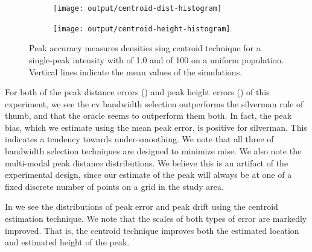 \begin{figure}[htbp]
    \centering
    \begin{subfigure}[b]{0.45\textwidth}
        \texttt{[image: output/centroid-dist-histogram]}
    \end{subfigure}
    \begin{subfigure}[b]{0.45\textwidth}
        \texttt{[image: output/centroid-height-histogram]}
    \end{subfigure}
    \caption[Centroid accuracy: Single-peak of 100 on uniform population]{Peak accuracy measures densities sing centroid technique for a single-peak intensity with  of 1.0 and  of 100 on a uniform population. Vertical lines indicate the mean values of the simulations.}
    \label{fig:centroids:unif_100_1.0_1h}
\end{figure}

For both of the peak distance errors () and peak height errors () of this experiment,
we see the \gls{cv} bandwidth selection outperforms the \gls{silverman} rule of thumb, and that the \gls{oracle} seems to outperform them both.
In fact, the \gls{peak bias}, which we estimate using the mean \gls{peak error},
is positive for \gls{silverman}.
This indicates a tendency towards under-smoothing.
We note that all three of bandwidth selection techniques are designed to minimize \gls{mise}.
We also note the multi-modal peak distance distributions.
We believe this is an artifact of the experimental design,
since our estimate of the peak will always be at one of a fixed discrete number of points on a grid in the study area.

In  we see the distributions of \gls{peak error} and \gls{peak drift} using the centroid estimation technique.
We note that the scales of both types of error are markedly improved.
That is, the centroid technique improves both the estimated location and estimated height of the peak.

